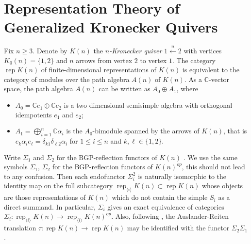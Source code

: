 \documentclass[smallextended,envcountsect,envcountsame]{svjour3}
\numberwithin{equation}{section}
\newcommand{\CC}{\mathbb{C}}
\newcommand{\rep}{\operatorname{rep}}
\begin{document}
\section{Representation Theory of Generalized Kronecker Quivers}
\label{sec:RepK(n)}

\noindent Fix $n\ge3$. Denote by $K(n)$ the \emph{$n$-Kronecker quiver} $1\stackrel{n}{\longleftarrow}2$ with vertices $K_0(n)=\{1,2\}$ and $n$ arrows from vertex $2$ to vertex $1$. 
The category $\rep K(n)$ of finite-dimensional representations of $K(n)$ is equivalent to the category of modules over the path algebra $A(n)$ of $K(n)$.
As a $\CC$-vector space, the path algebra $A(n)$ can be written as $A_0\oplus A_1$, where 
\begin{itemize}
  \item $A_0=\CC e_1\oplus \CC e_2$ is a two-dimensional semisimple algebra with orthogonal idempotents $e_1$ and $e_2$;
  \item $A_1=\bigoplus_{i=1}^n \CC\alpha_i$ is the $A_0$-bimodule spanned by the arrows of $K(n)$, that is $e_k\alpha_ie_\ell=\delta_{k1}\delta_{\ell2}\alpha_i$ for $1\le i\le n$ and $k,\ell\in\{1,2\}$.
\end{itemize}

Write $\Sigma_1$ and $\Sigma_2$ for the BGP-reflection functors of $K(n)$ \cite{bgp}. 
We use the same symbols $\Sigma_1$, $\Sigma_2$ for the BGP-reflection functors of $K(n)^{op}$, this should not lead to any confusion. 
Then each endofunctor $\Sigma_i^2$ is naturally isomorphic to the identity map on the full subcategory $\rep_{\langle i\rangle} K(n)\subset \rep K(n)$ whose objects are those representations of $K(n)$ which do not contain the simple $S_i$ as a direct summand.
In particular, $\Sigma_i$ gives an exact equivalence of categories $\Sigma_i:\rep_{\langle i\rangle} K(n)\to\rep_{\langle i\rangle} K(n)^{op}$.
Also, following \cite{brenner-butler}, the Auslander-Reiten translation $\tau:\rep K(n)\to\rep K(n)$ may be identified with the functor $\Sigma_2\Sigma_1$.
\end{document}
